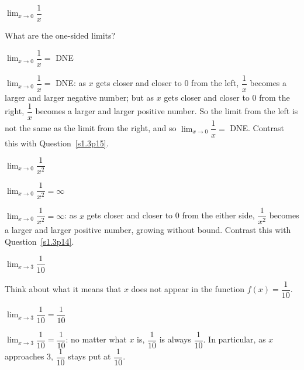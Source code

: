 \begin{Mquestion}\label{s1.3p14}
$\displaystyle\lim_{x \rightarrow 0} \dfrac{1}{x}$
\end{Mquestion}
\begin{hint}
What are the one-sided limits?
\end{hint}
\begin{answer} $\displaystyle\lim_{x \rightarrow 0} \dfrac{1}{x}=$ DNE
\end{answer}
\begin{solution}
$\displaystyle\lim_{x \rightarrow 0} \dfrac{1}{x}=$ DNE:
as $x$ gets closer and closer to 0 from the left, $\dfrac{1}{x}$ becomes a larger and larger negative number; but as $x$ gets closer and closer to 0 from the right, $\dfrac{1}{x}$ becomes a larger and larger positive number. So the limit from the left is not the same as the limit from the right, and so $\displaystyle\lim_{x \rightarrow 0} \dfrac{1}{x}=$ DNE. Contrast this with Question~\ref{s1.3p15}.
\end{solution}


\begin{Mquestion}\label{s1.3p15}
$\displaystyle\lim_{x \rightarrow 0} \dfrac{1}{x^2}$
\end{Mquestion}
\begin{answer}
$\displaystyle\lim_{x \rightarrow 0} \dfrac{1}{x^2}=\infty$
\end{answer}
\begin{solution}
$\displaystyle\lim_{x \rightarrow 0} \dfrac{1}{x^2}=\infty$:
as $x$ gets closer and closer to 0 from the either side, $\dfrac{1}{x^2}$ becomes a larger and larger positive number, growing without bound.
Contrast this with Question~\ref{s1.3p14}.
\end{solution}

\begin{Mquestion}
$\displaystyle\lim_{x \rightarrow 3} \dfrac{1}{10}$
\end{Mquestion}
\begin{hint}
Think about what it means that $x$ does not appear in the function $f(x)=\dfrac{1}{10}$.
\end{hint}
\begin{answer}
$\displaystyle\lim_{x \rightarrow 3} \dfrac{1}{10}=\dfrac{1}{10}$
\end{answer}
\begin{solution}
$\displaystyle\lim_{x \rightarrow 3} \dfrac{1}{10}=\dfrac{1}{10}$: no matter what $x$ is, $\dfrac{1}{10}$ is always $\dfrac{1}{10}$. In particular, as $x$ approaches 3, $\dfrac{1}{10}$ stays put at $\dfrac{1}{10}$.
\end{solution}


